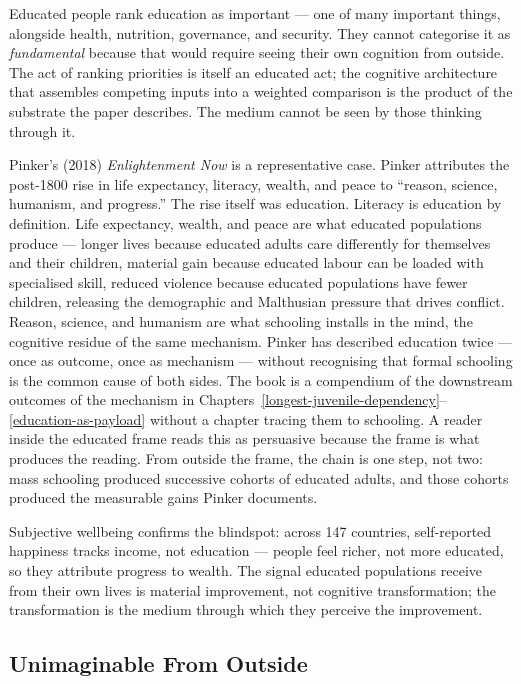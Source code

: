 \documentclass[12pt,letterpaper]{article}
\begin{document}
Educated people rank education as important --- one of many important
things, alongside health, nutrition, governance, and security. They
cannot categorise it as \emph{fundamental} because that would require
seeing their own cognition from outside. The act of ranking priorities
is itself an educated act; the cognitive architecture that assembles
competing inputs into a weighted comparison is the product of the
substrate the paper describes. The medium cannot be seen by those
thinking through it.

Pinker's (2018) \emph{Enlightenment Now} is a representative case.
Pinker attributes the post-1800 rise in life expectancy, literacy,
wealth, and peace to ``reason, science, humanism, and progress.'' The
rise itself was education. Literacy is education by definition.
Life expectancy, wealth, and peace are what educated populations
produce --- longer lives because educated adults care differently for
themselves and their children, material gain because educated labour
can be loaded with specialised skill, reduced violence because educated
populations have fewer children, releasing the demographic and
Malthusian pressure that drives conflict. Reason, science, and humanism
are what schooling installs in the mind, the cognitive residue
of the same mechanism. Pinker has described education twice --- once
as outcome, once as mechanism --- without recognising that formal
schooling is the common cause of both sides. The book is a compendium
of the downstream outcomes of the mechanism in
Chapters~\ref{longest-juvenile-dependency}--\ref{education-as-payload}
without a chapter tracing them to schooling. A reader inside the
educated frame reads this as persuasive because the frame is what
produces the reading. From outside the frame, the chain is one step,
not two: mass schooling produced successive cohorts of educated adults,
and those cohorts produced the measurable gains Pinker documents.

Subjective wellbeing confirms the blindspot: across 147 countries,
self-reported happiness tracks income, not education --- people feel
richer, not more educated, so they attribute progress to
wealth. The signal
educated populations receive from their own lives is material
improvement, not cognitive transformation; the transformation is the
medium through which they perceive the improvement.

\subsection{Unimaginable From Outside}\label{unimaginable-from-outside}
\end{document}
